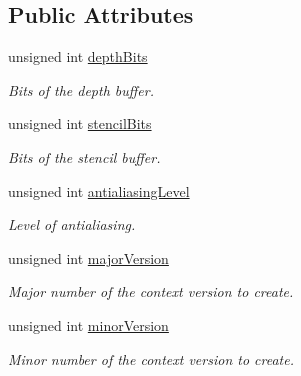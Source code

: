 \subsection*{Public Attributes}
\begin{DoxyCompactItemize}
\item 
\hypertarget{structsf_1_1ContextSettings_a4809e22089c2af7276b8809b5aede7bb}{unsigned int \hyperlink{structsf_1_1ContextSettings_a4809e22089c2af7276b8809b5aede7bb}{depth\-Bits}}\label{structsf_1_1ContextSettings_a4809e22089c2af7276b8809b5aede7bb}

\begin{DoxyCompactList}\small\item\em Bits of the depth buffer. \end{DoxyCompactList}\item 
\hypertarget{structsf_1_1ContextSettings_ac2e788c201ca20e84fd38a28071abd29}{unsigned int \hyperlink{structsf_1_1ContextSettings_ac2e788c201ca20e84fd38a28071abd29}{stencil\-Bits}}\label{structsf_1_1ContextSettings_ac2e788c201ca20e84fd38a28071abd29}

\begin{DoxyCompactList}\small\item\em Bits of the stencil buffer. \end{DoxyCompactList}\item 
\hypertarget{structsf_1_1ContextSettings_ac4a097be18994dba38d73f36b0418bdc}{unsigned int \hyperlink{structsf_1_1ContextSettings_ac4a097be18994dba38d73f36b0418bdc}{antialiasing\-Level}}\label{structsf_1_1ContextSettings_ac4a097be18994dba38d73f36b0418bdc}

\begin{DoxyCompactList}\small\item\em Level of antialiasing. \end{DoxyCompactList}\item 
\hypertarget{structsf_1_1ContextSettings_a99a680d5c15a7e34c935654155dd5166}{unsigned int \hyperlink{structsf_1_1ContextSettings_a99a680d5c15a7e34c935654155dd5166}{major\-Version}}\label{structsf_1_1ContextSettings_a99a680d5c15a7e34c935654155dd5166}

\begin{DoxyCompactList}\small\item\em Major number of the context version to create. \end{DoxyCompactList}\item 
\hypertarget{structsf_1_1ContextSettings_aaeb0efe9d2658b840da93b30554b100f}{unsigned int \hyperlink{structsf_1_1ContextSettings_aaeb0efe9d2658b840da93b30554b100f}{minor\-Version}}\label{structsf_1_1ContextSettings_aaeb0efe9d2658b840da93b30554b100f}

\begin{DoxyCompactList}\small\item\em Minor number of the context version to create. \end{DoxyCompactList}\end{DoxyCompactItemize}


